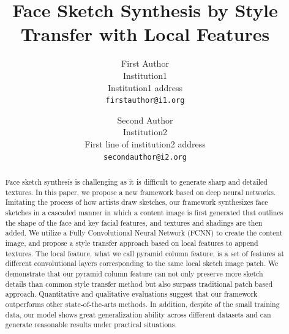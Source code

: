 \documentclass[10pt,twocolumn,letterpaper]{article}
\begin{document}
\title{Face Sketch Synthesis by Style Transfer with Local Features}

\author{First Author\\
Institution1\\
Institution1 address\\
{\tt\small firstauthor@i1.org}
\and
Second Author\\
Institution2\\
First line of institution2 address\\
{\tt\small secondauthor@i2.org}
}

\maketitle


\begin{abstract}

Face sketch synthesis is challenging as it is difficult to generate sharp and detailed textures. In this paper, we propose a new framework based on deep neural networks. Imitating the process of how artists draw sketches, our framework synthesizes face sketches in a cascaded manner in which a content image is first generated that outlines the shape of the face and key facial features, and textures and shadings are then added. We utilize a Fully Convolutional Neural Network (FCNN) to create the content image, and propose a style transfer approach based on local features to append textures. The local feature, what we call pyramid column feature, is a set of features at different convolutional layers corresponding to the same local sketch image patch. We demonstrate that our pyramid column feature can not only preserve more sketch details than common style transfer method but also surpass traditional patch based approach. Quantitative and qualitative evaluations suggest that our framework outperforms other state-of-the-arts methods. In addition, despite of the small training data, our model shows great generalization ability across different datasets and can generate reasonable results under practical situations.

\end{abstract}
\end{document}
